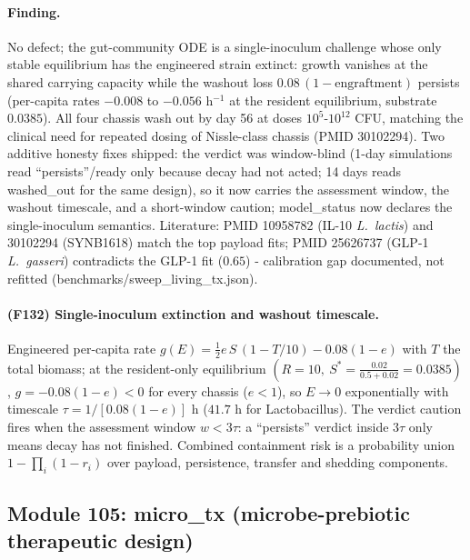 \paragraph{Finding.} No defect; the gut-community ODE is a single-inoculum challenge whose only stable equilibrium has the engineered strain extinct: growth vanishes at the shared carrying capacity while the washout loss $0.08\,(1-\mathrm{engraftment})$ persists (per-capita rates $-0.008$ to $-0.056$ h$^{-1}$ at the resident equilibrium, substrate $0.0385$). All four chassis wash out by day 56 at doses $10^5$-$10^{12}$ CFU, matching the clinical need for repeated dosing of Nissle-class chassis (PMID 30102294). Two additive honesty fixes shipped: the verdict was window-blind (1-day simulations read ``persists''/ready only because decay had not acted; 14 days reads washed\_out for the same design), so it now carries the assessment window, the washout timescale, and a short-window caution; model\_status now declares the single-inoculum semantics. Literature: PMID 10958782 (IL-10 \emph{L.\ lactis}) and 30102294 (SYNB1618) match the top payload fits; PMID 25626737 (GLP-1 \emph{L.\ gasseri}) contradicts the GLP-1 fit ($0.65$) - calibration gap documented, not refitted (benchmarks/sweep\_living\_tx.json).
\paragraph{(F132) Single-inoculum extinction and washout timescale.} Engineered per-capita rate $g(E)=\tfrac12 e\,S\,(1-T/10)-0.08(1-e)$ with $T$ the total biomass; at the resident-only equilibrium $(R{=}10,\ S^\ast=\tfrac{0.02}{0.5+0.02}=0.0385)$, $g=-0.08(1-e)<0$ for every chassis ($e<1$), so $E{\to}0$ exponentially with timescale $\tau=1/[0.08(1-e)]$ h ($41.7$ h for Lactobacillus). The verdict caution fires when the assessment window $w<3\tau$: a ``persists'' verdict inside $3\tau$ only means decay has not finished. Combined containment risk is a probability union $1-\prod_i(1-r_i)$ over payload, persistence, transfer and shedding components.
\subsection{Module 105: micro\_tx (microbe-prebiotic therapeutic design)}
